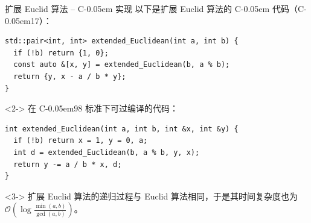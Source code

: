 \documentclass{../pkslide}
\newcommand{\Cpp}{\texorpdfstring{C\kern-0.05em\protect\raisebox{.35ex}{\textsmaller[2]{+\kern-0.05em+}}}{C++}}
\begin{document}
\begin{frame}[fragile]{扩展 Euclid 算法 -- \Cpp{} 实现}
  以下是扩展 Euclid 算法的 \Cpp{} 代码（\Cpp{}17）：
  
\begin{verbatim}
std::pair<int, int> extended_Euclidean(int a, int b) {
  if (!b) return {1, 0};
  const auto &[x, y] = extended_Euclidean(b, a % b);
  return {y, x - a / b * y};
}
\end{verbatim}
  
  \begin{visibleenv}<2->
    在 \Cpp{}98 标准下可过编译的代码：
    
\begin{verbatim}
int extended_Euclidean(int a, int b, int &x, int &y) {
  if (!b) return x = 1, y = 0, a;
  int d = extended_Euclidean(b, a % b, y, x);
  return y -= a / b * x, d;
}
\end{verbatim}
  \end{visibleenv}
  
  \begin{visibleenv}<3->
    扩展 Euclid 算法的递归过程与 Euclid 算法相同，于是其时间复杂度也为 $\mathcal O \!\left( \log \frac{\min(a, b)}{\gcd(a, b)} \right)$。
  \end{visibleenv}
\end{frame}
\end{document}

